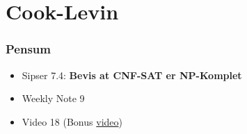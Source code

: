 \section{Cook-Levin}%
\label{sec:cooklevin}

\begin{frame}
  \frametitle{Pensum}
  \begin{itemize}
    \item Sipser 7.4: \textbf{Bevis at CNF-SAT er NP-Komplet}
    \item Weekly Note 9
    \item Video 18 (Bonus \href{https://www.youtube.com/watch?v=6Az1gtDRaAU}{video})
  \end{itemize}
\end{frame}



